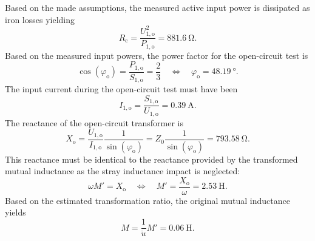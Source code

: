 \begin{solutionblock}
    Based on the made assumptions, the measured active input power is dissipated as iron losses yielding
    $$
    R_\mathrm{c} = \frac{U^2_{1,\mathrm{o}}}{P_{1,\mathrm{o}}} = \SI{881.6}{\ohm}.
    $$
    Based on the measured input powers, the power factor for the open-circuit test is
    $$
    \cos(\varphi_\mathrm{o}) = \frac{P_{1,\mathrm{o}}}{S_{1,\mathrm{o}}} = \frac{2}{3} \quad \Leftrightarrow \quad \varphi_\mathrm{o} = \SI{48.19}{\degree}.
    $$
    The input current during the open-circuit test must have been
    $$
    I_{1,\mathrm{o}} = \frac{S_{1,\mathrm{o}}}{U_{1,\mathrm{o}}} = \SI{0.39}{\ampere}. 
    $$
    The reactance of the open-circuit transformer is
    $$
    X_\mathrm{o} = \frac{U_{1,\mathrm{o}}}{I_{1,\mathrm{o}}}\frac{1}{\sin(\varphi_\mathrm{o})} = Z_\mathrm{0} \frac{1}{\sin(\varphi_\mathrm{o})} = \SI{793.58}{\ohm}.
    $$
    This reactance must be identical to the reactance provided by the transformed mutual inductance as the stray inductance impact is neglected:
    $$
    \omega M' = X_\mathrm{o} \quad \Leftrightarrow \quad M' =\frac{X_\mathrm{o}}{\omega} = \SI{2.53}{\henry}.
    $$
    Based on the estimated transformation ratio, the original mutual inductance yields
    $$
    M = \frac{1}{\ddot{u}}M' = \SI{0.06}{\henry}.
    $$
\end{solutionblock}



